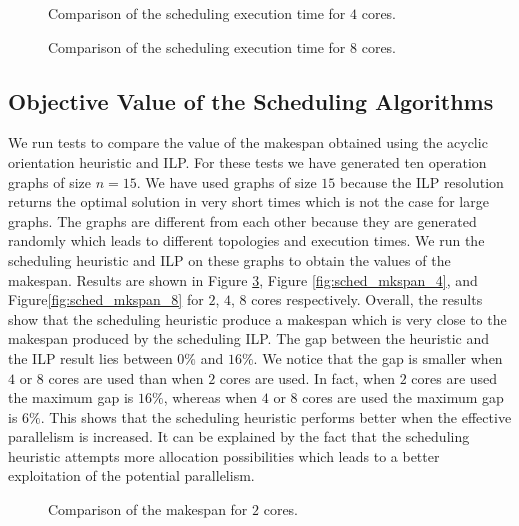 \begin{figure}[phbt]
\centering

\caption{Comparison of the scheduling execution time for $4$ cores.}
\label{fig:sched_exec_4}
\end{figure}

\begin{figure}[phbt]
\centering

\caption{Comparison of the scheduling execution time for $8$ cores.}
\label{fig:sched_exec_8}
\end{figure}

\subsection{Objective Value of the Scheduling Algorithms}

We run tests to compare the value of the makespan obtained using the acyclic orientation heuristic and ILP. For these tests we have generated ten operation graphs of size $n = 15$. We have used graphs of size $15$ because the ILP resolution returns the optimal solution in very short times which is not the case for large graphs. The graphs are different from each other because they are generated randomly which leads to different topologies and execution times. We run the scheduling heuristic and ILP on these graphs to obtain the values of the makespan. Results are shown in Figure \ref{fig:sched_mkspan_2}, Figure \ref{fig:sched_mkspan_4}, and Figure\ref{fig:sched_mkspan_8} for $2$, $4$, $8$ cores respectively. Overall, the results show that the scheduling heuristic produce a makespan which is very close to the makespan produced by the scheduling ILP. The gap between the heuristic and the ILP result lies between $0\%$ and $16\%$. We notice that the gap is smaller when $4$ or $8$ cores are used than when $2$ cores are used. In fact, when $2$ cores are used the maximum gap is $16\%$, whereas when $4$ or $8$ cores are used the maximum gap is $6\%$. This shows that the scheduling heuristic performs better when the effective parallelism is increased. It can be explained by the fact that the scheduling heuristic attempts more allocation possibilities which leads to a better exploitation of the potential parallelism.

\begin{figure}[phbt]
\centering

\caption{Comparison of the makespan for $2$ cores.}
\label{fig:sched_mkspan_2}
\end{figure}

